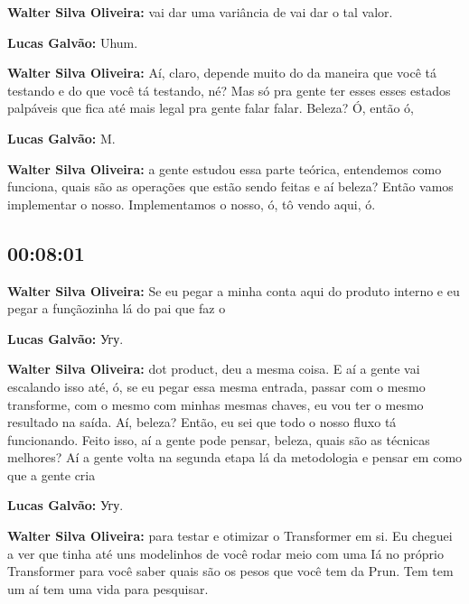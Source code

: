\textbf{Walter Silva Oliveira:} vai dar uma variância de vai dar o tal valor.



\textbf{Lucas Galvão:} Uhum.



\textbf{Walter Silva Oliveira:} Aí, claro, depende muito do da maneira que você tá testando e do que você tá testando, né? Mas só pra gente ter esses esses estados palpáveis que fica até mais legal pra gente falar falar. Beleza? Ó, então ó,



\textbf{Lucas Galvão:} M.



\textbf{Walter Silva Oliveira:} a gente estudou essa parte teórica, entendemos como funciona, quais são as operações que estão sendo feitas e aí beleza? Então vamos implementar o nosso. Implementamos o nosso, ó, tô vendo aqui, ó.



\subsection{\textbf{00:08:01}}



\textbf{Walter Silva Oliveira:} Se eu pegar a minha conta aqui do produto interno e eu pegar a funçãozinha lá do pai que faz o



\textbf{Lucas Galvão:} Угу.



\textbf{Walter Silva Oliveira:} dot product, deu a mesma coisa. E aí a gente vai escalando isso até, ó, se eu pegar essa mesma entrada, passar com o mesmo transforme, com o mesmo com minhas mesmas chaves, eu vou ter o mesmo resultado na saída. Aí, beleza? Então, eu sei que todo o nosso fluxo tá funcionando. Feito isso, aí a gente pode pensar, beleza, quais são as técnicas melhores? Aí a gente volta na segunda etapa lá da metodologia e pensar em como que a gente cria



\textbf{Lucas Galvão:} Угу.



\textbf{Walter Silva Oliveira:} para testar e otimizar o Transformer em si. Eu cheguei a ver que tinha até uns modelinhos de você rodar meio com uma Iá no próprio Transformer para você saber quais são os pesos que você tem da Prun. Tem tem um aí tem uma vida para pesquisar.



